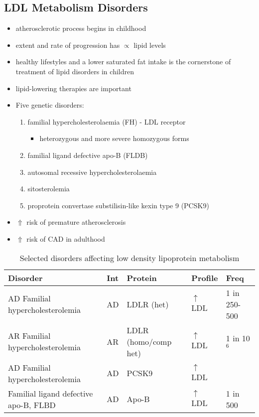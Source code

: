 \documentclass{scrartcl}
\begin{document}
\subsection{LDL Metabolism Disorders}
\label{sec:orgb5c16e0}
\begin{itemize}
\item atherosclerotic process begins in childhood
\item extent and rate of progression has \(\propto\) lipid levels
\item healthy lifestyles and a lower saturated fat intake is the
cornerstone of treatment of lipid disorders in children
\item lipid-lowering therapies are important

\item Five genetic disorders:
\begin{enumerate}
\item familial hypercholesterolaemia (FH) - LDL receptor
\begin{itemize}
\item heterozygous and more severe homozygous forms
\end{itemize}
\item familial ligand defective apo-B (FLDB)
\item autosomal recessive hypercholesterolaemia
\item sitosterolemia
\item proprotein convertase substilisin-like kexin type 9 (PCSK9)
\end{enumerate}
\item \(\Uparrow\) risk of premature atherosclerosis
\item \(\Uparrow\) risk of CAD in adulthood
\end{itemize}

\begin{table}[htbp]
\caption{\label{tab:org2ce3de0}
Selected disorders affecting low density lipoprotein metabolism}
\centering
\begin{tabular}{lllll}
Disorder & Int & Protein & Profile & Freq\\
\hline
AD Familial hypercholesterolemia & AD & LDLR (het) & \(\uparrow\) LDL & 1 in 250-500\\
AR Familial hypercholesterolemia & AR & LDLR (homo/comp het) & \(\uparrow\) LDL & 1 in 10\(^{\text{6}}\)\\
AD Familial hypercholesterolemia & AD & PCSK9 & \(\uparrow\) LDL & \\
Familial ligand defective apo-B, FLBD & AD & Apo-B & \(\uparrow\) LDL & 1 in 500\\
\end{tabular}
\end{table}
\end{document}
